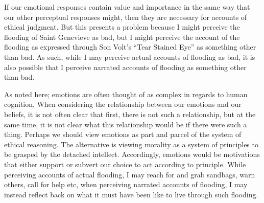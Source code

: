 \documentclass[
  letterpaper,
  DIV=11,
  numbers=noendperiod]{scrartcl}
\theoremstyle{remark}
\begin{document}
If our emotional responses contain value and importance in the same way
that our other perceptual responses might, then they are necessary for
accounts of ethical judgment. But this presents a problem because I
might perceive the flooding of Saint Genevieve as bad, but I might
perceive the account of the flooding as expressed through Son Volt's
``Tear Stained Eye'' as something other than bad. As such, while I may
perceive actual accounts of flooding as bad, it is also possible that I
perceive narrated accounts of flooding as something other than bad.

As noted here; emotions are often thought of as complex in regards to
human cognition. When considering the relationship between our emotions
and our beliefs, it is not often clear that first, there is not such a
relationship, but at the same time, it is not clear what this
relationship would be if there were such a thing. Perhaps we should view
emotions as part and parcel of the system of ethical reasoning. The
alternative is viewing morality as a system of principles to be grasped
by the detached intellect. Accordingly, emotions would be motivations
that either support or subvert our choice to act according to principle.
While perceiving accounts of actual flooding, I may reach for and grab
sandbags, warn others, call for help etc, when perceiving narrated
accounts of flooding, I may instead reflect back on what it must have
been like to live through such flooding.
\end{document}
